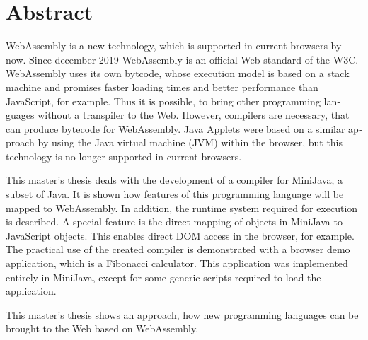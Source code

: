 \chapter{Abstract}


\begin{english}
WebAssembly is a new technology, which is supported in current browsers by now. Since december 2019 WebAssembly is an official Web standard of the W3C. WebAssembly uses its own bytcode, whose execution model is based on a stack machine and promises faster loading times and better performance than JavaScript, for example. Thus it is possible, to bring other programming languages without a transpiler to the Web. However, compilers are necessary, that can produce bytecode for WebAssembly. Java Applets were based on a similar approach by using the Java virtual machine (JVM) within the browser, but this technology is no longer supported in current browsers.

This master's thesis deals with the development of a compiler for MiniJava, a subset of Java. It is shown how features of this programming language will be mapped to WebAssembly. In addition, the runtime system required for execution is described. A special feature is the direct mapping of objects in MiniJava to JavaScript objects. This enables direct DOM access in the browser, for example. The practical use of the created compiler is demonstrated with a browser demo application, which is a Fibonacci calculator. This application was implemented entirely in MiniJava, except for some generic scripts required to load the application.

This master's thesis shows an approach, how new programming languages can be brought to the Web based on WebAssembly.
\end{english}
